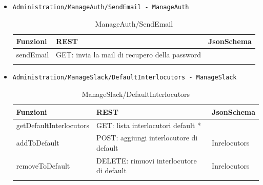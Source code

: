 \documentclass[../DefinizioneDiProdotto_v3.0.0.tex]{subfiles}
\begin{document}
\begin{itemize}
	\item \texttt{Administration/ManageAuth/SendEmail - ManageAuth}
	      \begin{longtable}[c] { >{\centering\arraybackslash}p{4cm} >{\centering\arraybackslash}p{6cm} >{\centering\arraybackslash}p{3cm}}
	      	\toprule
	      	\centerline{\textbf{Funzioni}} & \centerline{\textbf{REST}}                    & \centerline{\textbf{JsonSchema}} \\
	      	\midrule
	      	sendEmail                      & GET: invia la mail di recupero della password &                                  \\
	      	\bottomrule
	      	\caption{ManageAuth/SendEmail}
	      \end{longtable}

	\item \texttt{Administration/ManageSlack/DefaultInterlocutors - ManageSlack}
	      \begin{longtable}[c] { >{\centering\arraybackslash}p{4cm} >{\centering\arraybackslash}p{6cm} >{\centering\arraybackslash}p{3cm}}
	      	\toprule
	      	\centerline{\textbf{Funzioni}} & \centerline{\textbf{REST}}               & \centerline{\textbf{JsonSchema}} \\
	      	\midrule
	      	getDefaultInterlocutors        & GET: lista interlocutori default *       &                                  \\
	      	\addlinespace[0.3em]
	      	\midrule
	      	\addlinespace[0.3em]
	      	addToDefault                   & POST: aggiungi interlocutore di default  & Inrelocutors                     \\
	      	\addlinespace[0.3em]
	      	\midrule
	      	\addlinespace[0.3em]
	      	removeToDefault                & DELETE: rimuovi interlocutore di default & Inrelocutors                     \\
	      	\bottomrule
	      	\caption{ManageSlack/DefaultInterlocutors}
	      \end{longtable}


\end{itemize}
\end{document}

